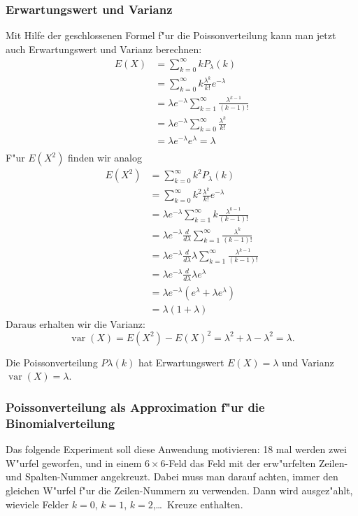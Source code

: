\subsubsection{Erwartungswert und Varianz}
Mit Hilfe der geschlossenen Formel f"ur die Poissonverteilung kann man
jetzt auch Erwartungswert und Varianz berechnen:
\begin{align*}
E(X)
&=\sum_{k=0}^\infty kP_\lambda(k)\\
&=\sum_{k=0}^\infty k\frac{\lambda^k}{k!}e^{-\lambda}\\
&=\lambda e^{-\lambda}\sum_{k=1}^\infty\frac{\lambda^{k-1}}{(k-1)!}\\
&=\lambda e^{-\lambda}\sum_{k=0}^\infty\frac{\lambda^k}{k!}\\
&=\lambda e^{-\lambda}e^\lambda=\lambda\\
\end{align*}
F"ur $E(X^2)$ finden wir analog
\begin{align*}
E(X^2)
&=\sum_{k=0}^\infty k^2P_\lambda(k)\\
&=\sum_{k=0}^\infty k^2\frac{\lambda^k}{k!}e^{-\lambda}\\
&=\lambda e^{-\lambda}\sum_{k=1}^\infty k\frac{\lambda^{k-1}}{(k-1)!}\\
&=\lambda e^{-\lambda}\frac{d}{d\lambda}\sum_{k=1}^\infty \frac{\lambda^k}{(k-1)!}\\
&=\lambda e^{-\lambda}\frac{d}{d\lambda}\lambda\sum_{k=1}^\infty \frac{\lambda^{k-1}}{(k-1)!}\\
&=\lambda e^{-\lambda}\frac{d}{d\lambda}\lambda e^{\lambda}\\
&=\lambda e^{-\lambda}(e^\lambda+\lambda e^\lambda)\\
&=\lambda(1+\lambda)
\end{align*}
Daraus erhalten wir die Varianz:
\[
\operatorname{var}(X)=E(X^2)-E(X)^2=\lambda^2+\lambda -\lambda^2 =\lambda.
\]
\begin{satz}
Die Poissonverteilung $P\lambda(k)$ hat Erwartungswert
$E(X)=\lambda$ und Varianz $\operatorname{var}(X)=\lambda$.
\end{satz}

\subsubsection{Poissonverteilung als Approximation f"ur die Binomialverteilung}
Das folgende Experiment soll diese Anwendung motivieren: 18 mal werden zwei 
W"urfel geworfen, und in einem $6\times 6$-Feld das Feld mit der
erw"urfelten Zeilen- und Spalten-Nummer angekreuzt.
Dabei muss man darauf
achten, immer den gleichen W"urfel f"ur die Zeilen-Nummern zu verwenden.
Dann wird ausgez"ahlt, wieviele Felder $k=0$, $k=1$, $k=2$,\dots\ Kreuze
enthalten.

